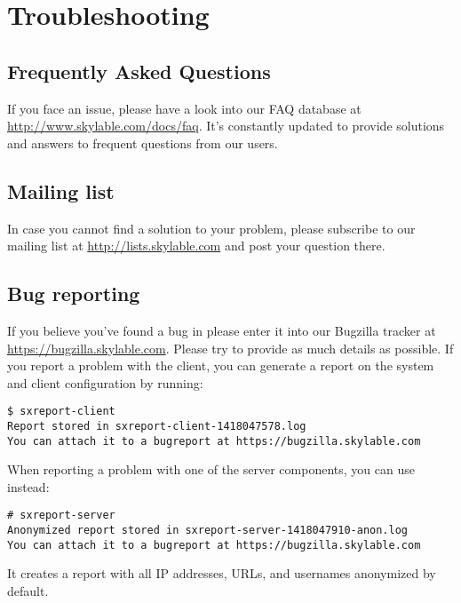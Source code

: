 \chapter{Troubleshooting}

\section{Frequently Asked Questions}
If you face an issue, please have a look into our FAQ database
at \url{http://www.skylable.com/docs/faq}. It's constantly
updated to provide solutions and answers to frequent questions
from our users.

\section{Mailing list}
In case you cannot find a solution to your problem, please
subscribe to our mailing list  at
\url{http://lists.skylable.com} and post your question there.

\section{Bug reporting}
If you believe you've found a bug in \SX please enter it into
our Bugzilla tracker at \url{https://bugzilla.skylable.com}.
Please try to provide as much details as possible. If you
report a problem with the client, you can generate a report on
the system and client configuration by running:
\begin{lstlisting}
$ sxreport-client
Report stored in sxreport-client-1418047578.log
You can attach it to a bugreport at https://bugzilla.skylable.com
\end{lstlisting}
When reporting a problem with one of the server components, you can
use  instead:
\begin{lstlisting}
# sxreport-server
Anonymized report stored in sxreport-server-1418047910-anon.log
You can attach it to a bugreport at https://bugzilla.skylable.com
\end{lstlisting}
It creates a report with all IP addresses, URLs, and usernames
anonymized by default.
